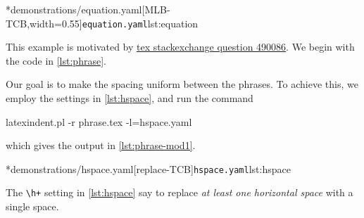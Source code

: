 \begin{example}
		\begin{cmhtcbraster}[
				raster force size=false,
				raster column 1/.style={add to width=-.1\textwidth},
				raster column skip=.06\linewidth]
			\cmhlistingsfromfile[style=yaml-LST]*{demonstrations/equation.yaml}[MLB-TCB,width=0.55\textwidth]{\texttt{equation.yaml}}{lst:equation}
		\end{cmhtcbraster}
	\end{example}

	\begin{example}
		This example is motivated by \href{https://tex.stackexchange.com/questions/490086/bring-several-lines-together-to-fill-blank-spaces-in-texmaker}{tex stackexchange question 490086}.
		We begin with the code in \cref{lst:phrase}.


		Our goal is to make the spacing uniform between the phrases. To achieve this, we employ the settings in \cref{lst:hspace},
		and run the command
		\begin{commandshell}
latexindent.pl -r phrase.tex -l=hspace.yaml
\end{commandshell}
		which gives the output in \cref{lst:phrase-mod1}.

		\begin{cmhtcbraster}
			\cmhlistingsfromfile[style=yaml-LST]*{demonstrations/hspace.yaml}[replace-TCB]{\texttt{hspace.yaml}}{lst:hspace}
		\end{cmhtcbraster}

		The \lstinline!\h+! setting in \cref{lst:hspace} say to replace \emph{at least one horizontal space} with a single space.
	\end{example}

